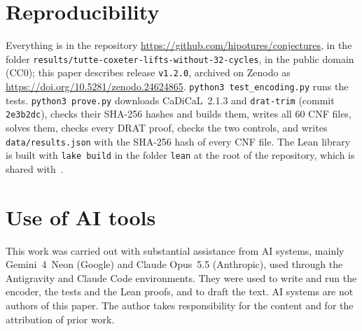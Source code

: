 \documentclass[11pt]{amsart}
\theoremstyle{remark}
\newcommand{\code}[1]{\texttt{#1}}
\begin{document}
\section{Reproducibility}\label{sec:repro}

Everything is in the repository \url{https://github.com/hipotures/conjectures},
in the folder \nolinkurl{results/tutte-coxeter-lifts-without-32-cycles}, in the
public domain (CC0); this paper describes release \code{v1.2.0}, archived on
Zenodo as \url{https://doi.org/10.5281/zenodo.24624865}.
\code{python3 test\_encoding.py} runs the tests. \code{python3 prove.py}
downloads CaDiCaL~2.1.3 and \code{drat-trim} (commit \code{2e3b2dc}), checks
their SHA-256 hashes and builds them, writes all $60$ CNF files, solves them,
checks every DRAT proof, checks the two controls, and writes
\code{data/results.json} with the SHA-256 hash of every CNF file. The Lean
library is built with \code{lake build} in the folder \code{lean} at the root
of the repository, which is shared with~\cite{Marszalek2026a}.

\section*{Use of AI tools}
This work was carried out with substantial assistance from AI systems, mainly
Gemini~4~Neon (Google) and Claude Opus~5.5 (Anthropic), used through the
Antigravity and Claude Code environments. They were used to write and run the
encoder, the tests and the Lean proofs, and to draft the text. AI systems are
not authors of this paper. The author takes responsibility for the content and
for the attribution of prior work.
\end{document}
